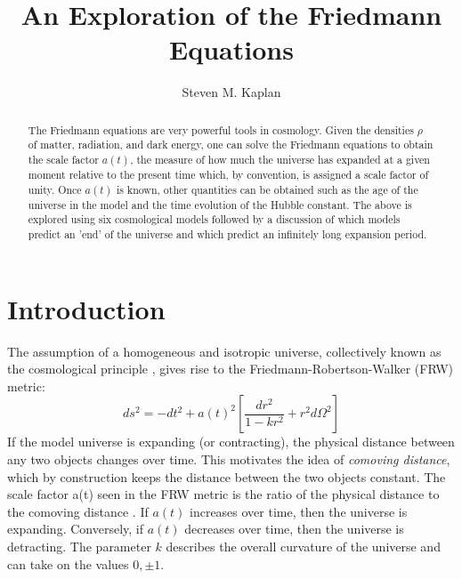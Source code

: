 \documentclass[aps,reprint,prl,floatfix,nofootinbib]{revtex4-1}
\begin{document}
\title{An Exploration of the Friedmann Equations}
\author{Steven M. Kaplan}

\begin{abstract}
The Friedmann equations are very powerful tools in cosmology.  Given the densities $\rho$ of matter, radiation, and dark energy, one can solve the Friedmann equations to obtain the scale factor $a(t)$, the measure of how much the universe has expanded at a given moment relative to the present time which, by convention, is assigned a scale factor of unity.  Once $a(t)$ is known, other quantities can be obtained such as the age of the universe in the model and the time evolution of the Hubble constant.  The above is explored using six cosmological models followed by a discussion of which models predict an 'end' of the universe and which predict an infinitely long expansion period.
\end{abstract}

\maketitle

\section*{Introduction}
The assumption of a homogeneous and isotropic universe, collectively known as the cosmological principle \cite{cosmoprinciple}, gives rise to the Friedmann-Robertson-Walker (FRW) metric:
$$ds^2=-dt^2 + a(t)^2\left[ \frac{dr^2}{1-kr^2} + r^2d\Omega^2 \right]$$
If the model universe is expanding (or contracting), the physical distance between any two objects changes over time.  This motivates the idea of \emph{comoving distance}, which by construction keeps the distance between the two objects constant.  The scale factor a(t) seen in the FRW metric is the ratio of the physical distance to the comoving distance \cite{wiki_scalefactor}.  If $a(t)$ increases over time, then the universe is expanding.  Conversely, if $a(t)$ decreases over time, then the universe is detracting.  The parameter $k$ describes the overall curvature of the universe and can take on the values $0,\pm1$.
\end{document}
